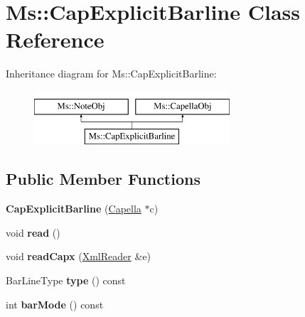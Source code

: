 \hypertarget{class_ms_1_1_cap_explicit_barline}{}\section{Ms\+:\+:Cap\+Explicit\+Barline Class Reference}
\label{class_ms_1_1_cap_explicit_barline}
Inheritance diagram for Ms\+:\+:Cap\+Explicit\+Barline\+:\begin{figure}[H]
\begin{center}
\leavevmode
\includegraphics[height=2.000000cm]{class_ms_1_1_cap_explicit_barline}
\end{center}
\end{figure}
\subsection*{Public Member Functions}
\begin{DoxyCompactItemize}
\item 
\mbox{\label{class_ms_1_1_cap_explicit_barline_aeffcddb50a7fe6596157f9ce53908165}} 
{\bfseries Cap\+Explicit\+Barline} (\hyperlink{class_ms_1_1_capella}{Capella} $\ast$c)
\item 
\mbox{\label{class_ms_1_1_cap_explicit_barline_ab11a16b0bdad4d97c92725f2267add4a}} 
void {\bfseries read} ()
\item 
\mbox{\label{class_ms_1_1_cap_explicit_barline_ade85845d633d6a1f4031d062bb768b06}} 
void {\bfseries read\+Capx} (\hyperlink{class_ms_1_1_xml_reader}{Xml\+Reader} \&e)
\item 
\mbox{\label{class_ms_1_1_cap_explicit_barline_a19a47b211a8844a9b95c9838f74b7bd9}} 
Bar\+Line\+Type {\bfseries type} () const
\item 
\mbox{\label{class_ms_1_1_cap_explicit_barline_ab883c2ce6fa06202d0eb7a89fafe1e83}} 
int {\bfseries bar\+Mode} () const
\end{DoxyCompactItemize}
